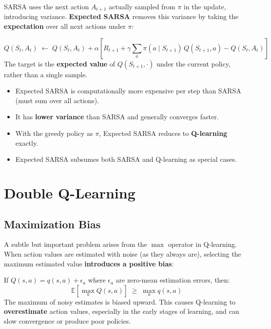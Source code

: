 \documentclass[11pt,a4paper]{article}
\theoremstyle{definition}
\theoremstyle{plain}
\theoremstyle{remark}
\begin{document}
SARSA uses the next action $A_{t+1}$ actually sampled from $\pi$ in the update, introducing variance. \textbf{Expected SARSA} removes this variance by taking the \textbf{expectation} over all next actions under $\pi$:

\begin{tcolorbox}[colback=blue!5!white, colframe=blue!60!black, title={Expected SARSA Update Rule}]
\[
    Q(S_t, A_t) \;\leftarrow\; Q(S_t, A_t) + \alpha\!\left[R_{t+1} + \gamma \sum_a \pi(a \mid S_{t+1})\, Q(S_{t+1}, a) - Q(S_t, A_t)\right]
\]
The target is the \textbf{expected value} of $Q(S_{t+1}, \cdot)$ under the current policy, rather than a single sample.
\end{tcolorbox}

\begin{itemize}
    \item Expected SARSA is computationally more expensive per step than SARSA (must sum over all actions).
    \item It has \textbf{lower variance} than SARSA and generally converges faster.
    \item With the greedy policy as $\pi$, Expected SARSA reduces to \textbf{Q-learning} exactly.
    \item Expected SARSA subsumes both SARSA and Q-learning as special cases.
\end{itemize}

\section{Double Q-Learning}

\subsection{Maximization Bias}

A subtle but important problem arises from the $\max$ operator in Q-learning. When action values are estimated with noise (as they always are), selecting the maximum estimated value \textbf{introduces a positive bias}:

\begin{tcolorbox}[colback=orange!5!white, colframe=orange!75!black, title={\textbf{Maximization Bias}}]
If $Q(s, a) = q(s, a) + \epsilon_a$ where $\epsilon_a$ are zero-mean estimation errors, then:
\[
    \mathbb{E}\!\left[\max_a Q(s, a)\right] \;\geq\; \max_a q(s, a)
\]
The maximum of noisy estimates is biased upward. This causes Q-learning to \textbf{overestimate} action values, especially in the early stages of learning, and can slow convergence or produce poor policies.
\end{tcolorbox}
\end{document}
